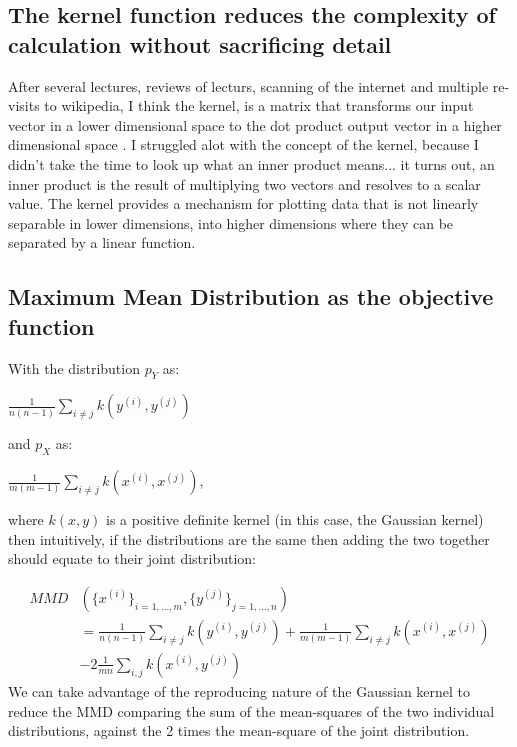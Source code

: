 \documentclass{article}
\begin{document}
\subsection{The kernel function reduces the complexity of calculation without sacrificing detail}
\label{ssec:kernel}

After several lectures, reviews of lecturs, scanning of the internet and multiple re-visits to wikipedia, I think the kernel, is a matrix that transforms our input vector in a lower dimensional space to the dot product output vector in a higher dimensional space \cite{wilimitis_2019} \cite{hofmann2008kernel}.  I struggled alot with the concept of the kernel, because I didn't take the time to look up what an inner product means... it turns out, an inner product is the result of multiplying two vectors and resolves to a scalar value.  The kernel provides a mechanism for plotting data that is not linearly separable in lower dimensions, into higher dimensions where they can be separated by a linear function.  

\subsection{Maximum Mean Distribution as the objective function}
\label{ssec:mmd}

With the distribution $p_Y$ as:  

$\frac {1}{n(n-1)}\sum_{i\ne j} k(y^{(i)}, y^{(j)})$  

and $p_X$ as:   

$\frac {1}{m(m-1)}\sum_{i\ne j} k(x^{(i)}, x^{(j)})$,  

where $k(x, y)$ is a positive definite kernel (in this case, the Gaussian
kernel) then intuitively, if the distributions are the same then adding the two together should equate to their joint distribution:  

$$
\begin {aligned}
MMD&(\{x^{(i)}\}_{i=1, ..., m}, \{y^{(j)}\}_{j=1, ..., n}) \\
  & = \frac {1}{n(n-1)}\sum_{i\ne j} k(y^{(i)}, y^{(j)}) 
  + \frac {1}{m(m-1)}\sum_{i\ne j} k(x^{(i)}, x^{(j)}) \\
  & - 2\frac{1}{mn}\sum_{i,j}k(x^{(i)},y^{(j)})
\end {aligned}
$$
%
We can take advantage of the reproducing nature of the Gaussian kernel to reduce the MMD comparing the sum of the mean-squares of the two individual distributions, against the 2 times the mean-square of the joint distribution. 
\end{document}

